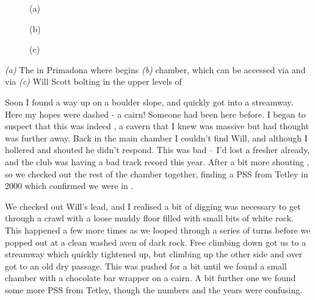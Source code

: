 \begin{pagefigure}
	\checkoddpage \ifoddpage \forcerectofloat \else \forceversofloat \fi
	\centering
	
   	\begin{subfigure}[t]{0.49\textwidth}
    	\centering
       	\caption{(a)} \label{The spiral climb}
    \end{subfigure}
    \hfill
	\begin{subfigure}[t]{0.49\textwidth}
		\centering
		 \caption{(b)}\label{Alkatraz}
	\end{subfigure}
    \vspace{0cm}
	
	\begin{subfigure}[h]{\textwidth}
		\centering
		\caption{(c)}\label{WS bolting}
	\end{subfigure}

         \caption{
   		\emph{(a)} The \protect{} in Primadona where \protect{} begins
     		\emph{(b)} \protect{} chamber, which can be accessed via \protect{} and \protect{} via \protect{}
     		\emph{(c)} Will Scott bolting in the upper levels of \protect{} 
		}
\end{pagefigure}

Soon I found a way up on a boulder slope, and quickly got into a streamway. Here my hopes were dashed - a cairn! Someone had been here before. I began to suspect that this was indeed , a cavern that I knew was massive but had thought was further away. Back in the main chamber I couldn't find Will, and although I hollered and shouted he didn't respond. This was bad -- I'd lost a fresher already, and the club was having a bad track record this year. After a bit more shouting , so we checked out the rest of the chamber together, finding a PSS from Tetley in 2000 which confirmed we were in .

We checked out Will's lead, and I realised a bit of digging was necessary to get through a crawl with a loose muddy floor filled with small bits of white rock. This happened a few more times as we looped through a series of turns before we popped out at a clean washed aven of dark rock. Free climbing down got us to a streamway which quickly tightened up, but climbing up the other side and over got to an old dry passage. This was pushed for a bit until we found a small chamber with a chocolate bar wrapper on a cairn. A bit further one we found some more PSS from Tetley, though the numbers and the years were confusing.

